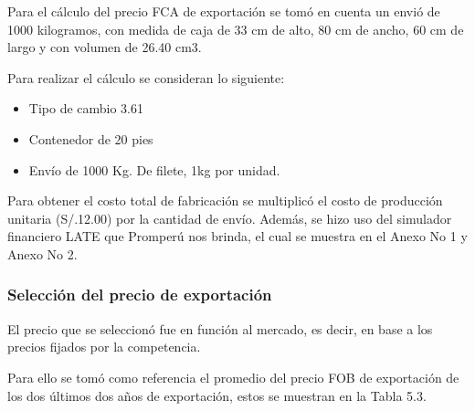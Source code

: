 \documentclass[
  stu,
  floatsintext,
  longtable,
  a4paper,
  nolmodern,
  notxfonts,
  notimes,
  12pt,
  colorlinks=true,linkcolor=blue,citecolor=blue,urlcolor=blue]{apa7}
\providecommand{\tightlist}{%
  \setlength{\itemsep}{0pt}\setlength{\parskip}{0pt}}
\begin{document}
Para el cálculo del precio FCA de exportación se tomó en cuenta un envió
de 1000 kilogramos, con medida de caja de 33 cm de alto, 80 cm de ancho,
60 cm de largo y con volumen de 26.40 cm3.

Para realizar el cálculo se consideran lo siguiente:

\begin{itemize}
\tightlist
\item
  Tipo de cambio 3.61
\item
  Contenedor de 20 pies
\item
  Envío de 1000 Kg. De filete, 1kg por unidad.
\end{itemize}

Para obtener el costo total de fabricación se multiplicó el costo de
producción unitaria (S/.12.00) por la cantidad de envío. Además, se hizo
uso del simulador financiero LATE que Promperú nos brinda, el cual se
muestra en el Anexo No 1 y Anexo No 2.

\subsubsection{Selección del precio de
exportación}\label{selecciuxf3n-del-precio-de-exportaciuxf3n}

El precio que se seleccionó fue en función al mercado, es decir, en base
a los precios fijados por la competencia.

Para ello se tomó como referencia el promedio del precio FOB de
exportación de los dos últimos dos años de exportación, estos se
muestran en la Tabla 5.3.
\end{document}
